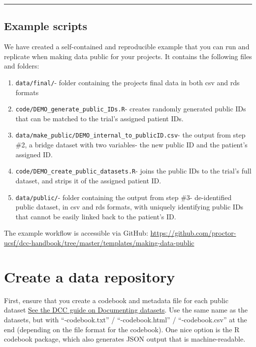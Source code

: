 \documentclass[
]{book}
\providecommand{\tightlist}{%
  \setlength{\itemsep}{0pt}\setlength{\parskip}{0pt}}
\begin{document}
\begin{center}\rule{0.5\linewidth}{0.5pt}\end{center}

\subsection{Example scripts}\label{example-scripts}

We have created a self-contained and reproducible example that you can run and replicate when making data public for your projects. It contains the following files and folders:

\begin{enumerate}
\def\labelenumi{\arabic{enumi}.}
\tightlist
\item
  \texttt{data/final/}- folder containing the projects final data in both csv and rds formats\\
\item
  \texttt{code/DEMO\_generate\_public\_IDs.R}- creates randomly generated public IDs that can be matched to the trial's assigned patient IDs.\\
\item
  \texttt{data/make\_public/DEMO\_internal\_to\_publicID.csv}- the output from step \#2, a bridge dataset with two variables- the new public ID and the patient's assigned ID.\\
\item
  \texttt{code/DEMO\_create\_public\_datasets.R}- joins the public IDs to the trial's full dataset, and strips it of the assigned patient ID.
\item
  \texttt{data/public/}- folder containing the output from step \#3- de-identified public dataset, in csv and rds formats, with uniquely identifying public IDs that cannot be easily linked back to the patient's ID.
\end{enumerate}

The example workflow is accessible via GitHub: \url{https://github.com/proctor-ucsf/dcc-handbook/tree/master/templates/making-data-public}

\section{Create a data repository}\label{create-a-data-repository}

First, ensure that you create a codebook and metadata file for each public dataset \href{https://proctor-ucsf.github.io/dcc-handbook/datawrangling.html\#documenting-datasets}{See the DCC guide on Documenting datasets}. Use the same name as the datasets, but with ``-codebook.txt'' / ``-codebook.html'' / ``-codebook.csv'' at the end (depending on the file format for the codebook). One nice option is the R codebook package, which also generates JSON output that is machine-readable.
\end{document}
